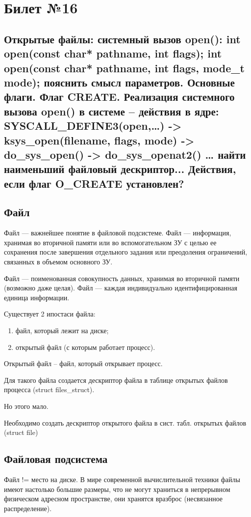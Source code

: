 \chapter{Билет №16}

\section*{Открытые файлы: системный вызов open(): int open(const char* pathname, int flags); int open(const char* pathname, int flags, mode\_t mode); пояснить смысл параметров. Основные флаги. Флаг CREATE. Реализация системного вызова open() в системе – действия в ядре: \\SYSCALL\_DEFINE3(open,…) -> ksys\_open(filename, flags, mode) -> do\_sys\_open() -> do\_sys\_openat2() … найти наименьший файловый дескриптор... Действия, если флаг O\_CREATE установлен?}

\section{Файл}
Файл --- важнейшее понятие в файловой подсистеме. Файл --- информация, хранимая во вторичной памяти или во вспомогательном ЗУ с целью ее сохранения после завершения отдельного задания или преодоления ограничений, связанных в объемом основного ЗУ.

Файл --- поименованная совокупность данных, хранимая во вторичной памяти (возможно даже целая). Файл --- каждая индивидуально идентифицированная единица информации.

Существует 2 ипостаси файла:
\begin{enumerate}
	\item файл, который лежит на диске;
	\item открытый файл (с которым работает процесс).
\end{enumerate}

Открытый файл -- файл, который открывает процесс.

Для такого файла создается дескриптор файла в таблице открытых файлов процесса (struct files\_struct).

Но этого мало.

Необходимо создать дескриптор открытого файла в сист. табл. открытых файлов (struct file)

\section{Файловая подсистема}
Файл != место на диске. В мире современной вычислительной техники файлы имеют настолько большие размеры, что не могут храниться в непрерывном физическом адресном пространстве, они хранятся вразброс (несвязанное распределение).

